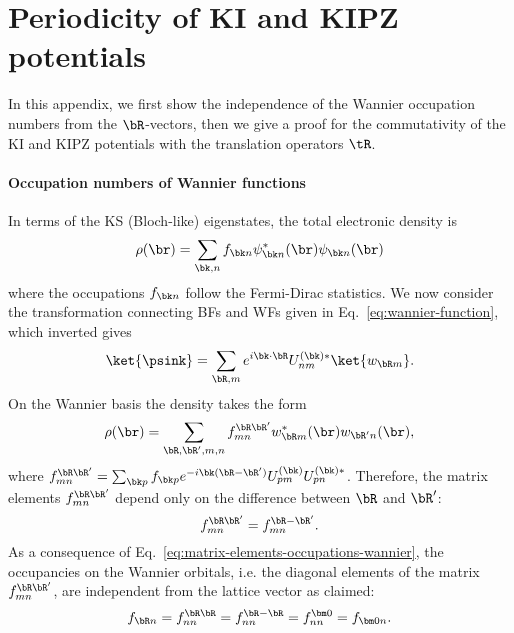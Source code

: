 \chapter{Periodicity of KI and KIPZ potentials\label{app:periodic-ki-kipz}}
In this appendix, we first show the independence of the Wannier occupation numbers from the $\bR$-vectors, then we give a proof for the commutativity of the KI and KIPZ potentials with the translation operators $\tR$.

\subsubsection*{Occupation numbers of Wannier functions}
In terms of the KS (Bloch-like) eigenstates, the total electronic density is
%
\begin{equation}
    \rho(\br) = \sum_{\bk,n} f_{\bk n} \psi^*_{\bk n}(\br) \psi_{\bk n}(\br)
    \label{eq:density-bloch}
\end{equation}
%
where the occupations $f_{\bk n}$ follow the Fermi-Dirac statistics. We now consider the transformation connecting BFs and WFs given in Eq.~\eqref{eq:wannier-function}, which inverted gives
%
\begin{equation}
    \ket{\psink} = \sum_{\bR,m} e^{i\bk \cdot \bR} U^{(\bk)*}_{nm} \ket{w_{\bR m}} .
    \label{eq:bloch-wannier}
\end{equation}
%
On the Wannier basis the density takes the form
%
\begin{equation}
    \rho(\br) = \sum_{\bR,\bR',m,n} f_{mn}^{\bR\bR'} w^*_{\bR m}(\br) w_{\bR' n}(\br) , 
\end{equation}
%
where $f_{mn}^{\bR\bR'} = \sum_{\bk p} f_{\bk p} e^{-i\bk(\bR-\bR')} U^{(\bk)}_{pm} U^{(\bk)*}_{pn}$. Therefore, the matrix elements $f_{mn}^{\bR\bR'}$ depend only on the difference between $\bR$ and $\bR'$:
\begin{equation}
    f_{mn}^{\bR\bR'} = f_{mn}^{\bR-\bR'} .
    \label{eq:matrix-elements-occupations-wannier}
\end{equation}
%
As a consequence of Eq.~\eqref{eq:matrix-elements-occupations-wannier}, the occupancies on the Wannier orbitals, i.e. the diagonal elements of the matrix $f_{mn}^{\bR\bR'}$, are independent from the lattice vector as claimed:
%
\begin{equation}
    f_{\bR n} = f_{nn}^{\bR\bR} = f_{nn}^{\bR-\bR} = f_{nn}^{\bm 0} = f_{{\bm 0}n} .
\end{equation}

